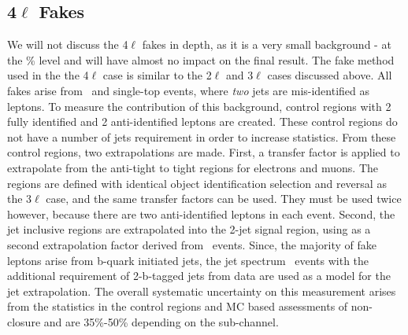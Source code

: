 \subsection{4$\ell$ Fakes}

We will not discuss the 4$\ell$ fakes in depth, as it is a very small background - at the \% level and will have almost no impact on the final result. The fake method used in the the 4$\ell$ case is similar to the 2$\ell$ and 3$\ell$ cases discussed above. All fakes arise from \ttbar\ and single-top events, where \textit{two} jets are mis-identified as leptons. To measure the contribution of this background, control regions with 2 fully identified and 2 anti-identified leptons are created. These control regions do not have a number of jets requirement in order to increase statistics.  From these control regions, two extrapolations are made. First, a transfer factor is applied to extrapolate from the anti-tight to tight regions for electrons and muons. The regions are defined with identical object identification selection and reversal as the 3$\ell$ case, and the same transfer factors can be used. They must be used twice however, because there are two anti-identified leptons in each event. Second, the jet inclusive regions are extrapolated into the 2-jet signal region, using as a second extrapolation factor derived from \ttbar\ events. Since, the majority of fake leptons arise from b-quark initiated jets, the jet spectrum \ttbar\ events with the additional requirement of 2-b-tagged jets from data are used as a model for the jet extrapolation. The overall systematic uncertainty on this measurement arises from the statistics in the control regions and MC based assessments of non-closure and are 35\%-50\% depending on the sub-channel. 


